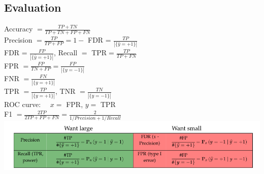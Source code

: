 \subsection*{Evaluation}
Accuracy $=\frac{TP+TN}{TP+TN+FP+FN}$\\
Precision $=\frac{TP}{TP+FP} = 1-$ FDR = $\frac{TP}{|\{\hat{y} = +1\}|}$\\
FDR = $\frac{FP}{|\{\hat{y} = +1\}|}$, Recall $=$ TPR$ =\frac{TP}{TP+FN}$\\
FPR $=\frac{FP}{TN+FP} = \frac{FP}{|\{y = -1\}|}$\\
FNR $=\frac{FN}{|\{ y = +1 \}|}$\\
TPR $=\frac{TP}{|\{ y = +1 \}|}$, TNR $=\frac{TN}{|\{ y = -1 \}|}$\\
ROC curve: \ \ $x=$ FPR, $y=$ TPR\\
F1 $=\frac{2TP}{2TP+FP+FN}=\frac{2}{1/Precision+1/Recall}$\\
\hspace*{-5mm}
\includegraphics[width=1.1 \linewidth]{matrix.png}
